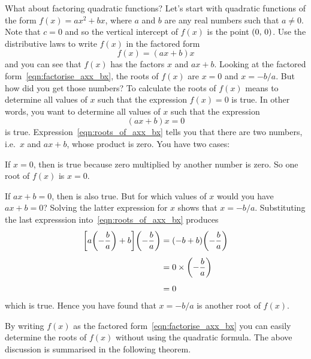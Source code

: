 \documentclass[a4paper,oneside,12pt]{article}
\begin{document}
What about factoring quadratic functions?  Let's start with quadratic
functions of the form $f(x) = ax^2 + bx$, where $a$ and $b$ are any
real numbers such that $a \neq 0$.  Note that $c = 0$ and so the
vertical intercept of $f(x)$ is the point $\left\lparen{0},\, {0}\right\rparen$.  Use the
distributive laws to write $f(x)$ in the factored form
\begin{equation}
\label{eqn:factorise_axx_bx}
f(x)
=
(ax + b)x
\end{equation}
and you can see that $f(x)$ has the factors $x$ and $ax + b$.  Looking
at the factored form~\eqref{eqn:factorise_axx_bx}, the roots of $f(x)$
are $x = 0$ and $x = -b/a$.  But how did you get those numbers?  To
calculate the roots of $f(x)$ means to determine all values of $x$
such that the expression $f(x) = 0$ is true.  In other words, you want
to determine all values of $x$ such that the expression
\begin{equation}
\label{eqn:roots_of_axx_bx}
(ax + b)x
=
0
\end{equation}
is true.  Expression~\eqref{eqn:roots_of_axx_bx} tells you that there
are two numbers, i.e.~$x$ and $ax + b$, whose product is zero.  You
have two cases:
\begin{packedenumeral}
\item If $x = 0$, then  is true
  because zero multiplied by another number is zero.  So one root of
  $f(x)$ is $x = 0$.

\item If $ax + b = 0$, then  is also
  true.  But for which values of $x$ would you have $ax + b = 0$?
  Solving the latter expression for $x$ shows that $x = -b / a$.
  Substituting the last expresssion into~\eqref{eqn:roots_of_axx_bx}
  produces
  \begin{align*}
  \squarebracket*{
    a \parenthesis*{-\frac{b}{a}}
    +
    b
  }
  \parenthesis*{-\frac{b}{a}}
  &=
  (-b + b)
  \parenthesis*{-\frac{b}{a}} \\[4pt]
  &=
  0 \times \parenthesis*{-\frac{b}{a}} \\[4pt]
  &=
  0
  \end{align*}
  which is true.  Hence you have found that $x = -b / a$ is another
  root of $f(x)$.
\end{packedenumeral}
By writing $f(x)$ as the factored form~\eqref{eqn:factorise_axx_bx}
you can easily determine the roots of $f(x)$ without using the
quadratic formula.  The above discussion is summarised in the
following theorem.
\end{document}
